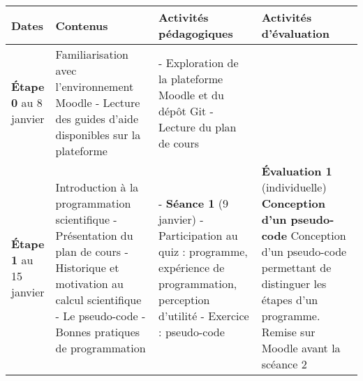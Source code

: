 \documentclass[12]{article}
\begin{document}
	\begin{center}
        \begin{tabular}{| p{0.1\linewidth} | p{0.3\linewidth} | p{0.3\linewidth} | p{0.3\linewidth} | } 
        \hline
        Dates & Contenus & Activités pédagogiques & Activités d'évaluation \\ [0.5ex] 
        \hline\hline
        \textbf{Étape 0} \linebreak 4 au 8 janvier & 
        Familiarisation avec l'environnement Moodle\hfill\hfill \linebreak\linebreak 
        	- Lecture des guides d’aide disponibles sur la plateforme\hfill\hfill &
        - Exploration de la plateforme Moodle et du dépôt Git\hfill\hfill \linebreak
        - Lecture du plan de cours\hfill\hfill \linebreak
         \\
         \hline
         \textbf{Étape 1} \linebreak 9 au 15 janvier & 
        Introduction à la programmation scientifique\hfill\hfill \linebreak\linebreak
            - Présentation du plan de cours\hfill \linebreak
			- Historique et motivation au calcul scientifique\hfill\hfill \linebreak
        	- Le pseudo-code\hfill\hfill \linebreak
    		- Bonnes pratiques de programmation\hfill\hfill & 
        - \textbf{Séance 1} (9 janvier)\hfill\hfill \linebreak
        - Participation au quiz : programme, expérience de programmation, perception d'utilité\hfill\hfill\hfill \linebreak
        - Exercice : pseudo-code\hfill\hfill\hfill \linebreak & 
        \textbf{Évaluation 1} (individuelle) \linebreak
        \textbf{Conception d'un pseudo-code}\hfill\hfill \linebreak
        Conception d'un pseudo-code permettant de distinguer les étapes d'un programme. Remise sur Moodle avant la scéance 2\hfill\hfill \\

\end{tabular}
\end{center}
\end{document}

